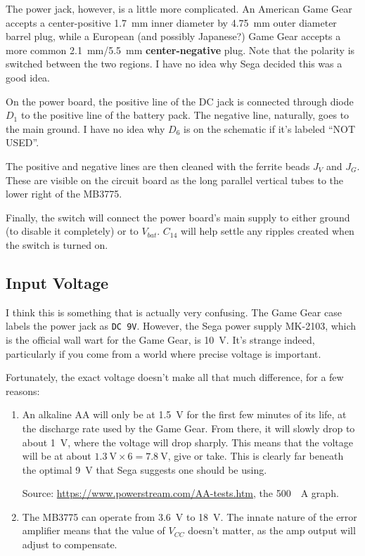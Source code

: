 \documentclass{article}
\newcommand{\Vbat}{$V_{bat}$}
\begin{document}
The power jack, however, is a little more complicated. An American
Game Gear accepts a center-positive \qty{1.7}{\milli\meter} inner
diameter by \qty{4.75}{\milli\meter} outer diameter barrel plug, while
a European (and possibly Japanese?) Game Gear accepts a more common
\qty{2.1}{\milli\meter}/\qty{5.5}{\milli\meter}
\textbf{center-negative} plug. Note that the polarity is switched
between the two regions. I have no idea why Sega decided this was a
good idea.

On the power board, the positive line of the DC jack is connected
through diode $D_1$ to the positive line of the battery pack. The
negative line, naturally, goes to the main ground. I have no idea why
$D_6$ is on the schematic if it's labeled ``NOT USED''.

The positive and negative lines are then cleaned with the ferrite
beads $J_V$ and $J_G$. These are visible on the circuit board as the
long parallel vertical tubes to the lower right of the MB3775.

Finally, the switch will connect the power board's main supply to
either ground (to disable it completely) or to \Vbat{}. $C_{14}$ will
help settle any ripples created when the switch is turned on.

\subsection{Input Voltage}
I think this is something that is actually very confusing. The Game
Gear case labels the power jack as \texttt{DC 9V}. However, the Sega
power supply MK-2103, which is the official wall wart for the Game
Gear, is \qty{10}{\volt}. It's strange indeed, particularly if you
come from a world where precise voltage is important.

Fortunately, the exact voltage doesn't make all that much
difference, for a few reasons:

\begin{enumerate}
\item An alkaline AA will only be at \qty{1.5}{\volt} for the first
  few minutes of its life, at the discharge rate used by the Game
  Gear. From there, it will slowly drop to about \qty{1}{\volt}, where
  the voltage will drop sharply. This means that the voltage will be
  at about $\qty{1.3}{\volt} \times{} 6 = \qty{7.8}{\volt}$, give or
  take. This is clearly far beneath the optimal \qty{9}{\volt} that
  Sega suggests one should be using.

  Source: \url{https://www.powerstream.com/AA-tests.htm}, the
  \qty{500}{\milli{}A} graph.
\item The MB3775 can operate from \qty{3.6}{\volt} to
  \qty{18}{\volt}. The innate nature of the error amplifier means that
  the value of $V_{CC}$ doesn't matter, as the amp output will adjust
  to compensate.
\end{enumerate}
\end{document}
